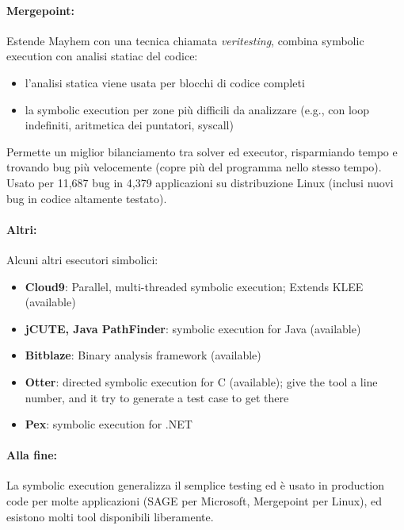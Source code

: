 \paragraph{Mergepoint:} Estende Mayhem con una tecnica chiamata \textit{veritesting}, combina symbolic execution con analisi statiac del codice:
\begin{itemize}
	\item l'analisi statica viene usata per blocchi di codice completi

	\item la symbolic execution per zone più difficili da analizzare (e.g., con loop indefiniti, aritmetica dei puntatori, syscall)
\end{itemize}
Permette un miglior bilanciamento tra solver ed executor, risparmiando tempo e trovando bug più velocemente (copre più del programma nello stesso tempo). Usato per 11,687 bug in 4,379 applicazioni su distribuzione Linux (inclusi nuovi bug in codice altamente testato).

\paragraph{Altri:} Alcuni altri esecutori simbolici: 
\begin{itemize}
	\item \textbf{Cloud9}: Parallel, multi-threaded symbolic execution; Extends KLEE (available)

	\item \textbf{jCUTE, Java PathFinder}: symbolic execution for Java (available)

	\item \textbf{Bitblaze}: Binary analysis framework (available)

	\item \textbf{Otter}: directed symbolic execution for C (available); give the tool a line number, and it try to generate a test case to get there

	\item \textbf{Pex}: symbolic execution for .NET
\end{itemize}

\paragraph{Alla fine:} La symbolic execution generalizza il semplice testing ed è usato in production code per molte applicazioni (SAGE per Microsoft, Mergepoint per Linux), ed esistono molti tool disponibili liberamente.